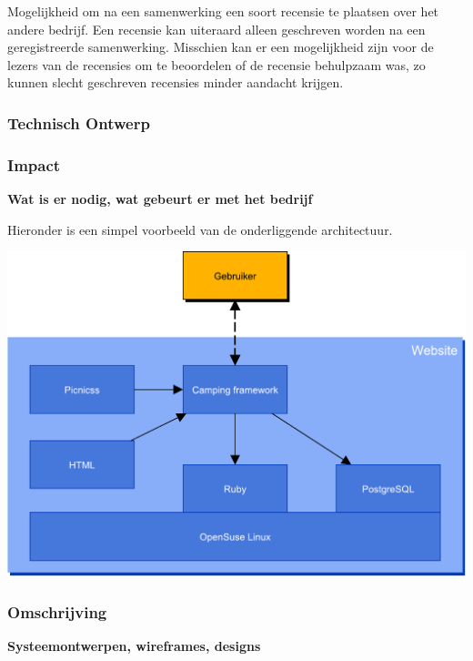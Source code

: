 Mogelijkheid om na een samenwerking een soort recensie te plaatsen
over het andere bedrijf. Een recensie kan uiteraard alleen geschreven
worden na een geregistreerde samenwerking. Misschien kan er een
mogelijkheid zijn voor de lezers van de recensies om te beoordelen of
de recensie behulpzaam was, zo kunnen slecht geschreven recensies
minder aandacht krijgen.

\subsubsection{Technisch Ontwerp}





\subsubsection{Impact}
{\bf Wat is er nodig, wat gebeurt er met het bedrijf}

Hieronder is een simpel voorbeeld van de onderliggende architectuur.

\includegraphics[width=\textwidth]{img/websiteArchitecture}

\subsubsection{Omschrijving}
{\bf Systeemontwerpen, wireframes, designs}